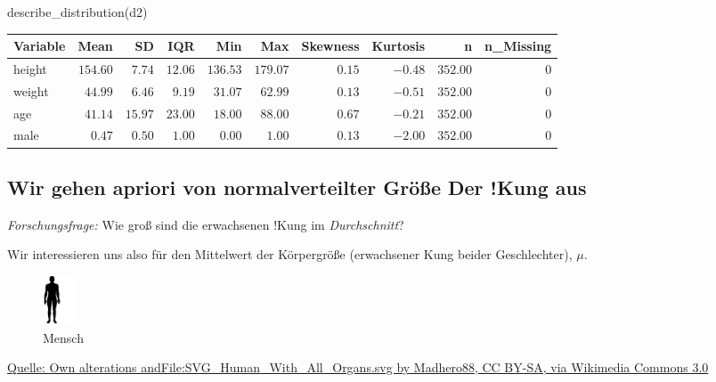 \documentclass[
  a4paper,
  DIV=11]{scrreprt}
\newenvironment{Shaded}{\begin{snugshade}}{\end{snugshade}}
\newcommand{\FunctionTok}[1]{\textcolor[rgb]{0.28,0.35,0.67}{#1}}
\newcommand{\NormalTok}[1]{\textcolor[rgb]{0.00,0.23,0.31}{#1}}
\theoremstyle{definition}
\theoremstyle{remark}
\begin{document}
\begin{Shaded}
\begin{Highlighting}[]
\FunctionTok{describe\_distribution}\NormalTok{(d2)}
\end{Highlighting}
\end{Shaded}

\begin{longtable}{lrrrrrrrrr}
\toprule
Variable & Mean & SD & IQR & Min & Max & Skewness & Kurtosis & n & n\_Missing \\ 
\midrule
height & $154.60$ & $7.74$ & $12.06$ & $136.53$ & $179.07$ & $0.15$ & $-0.48$ & $352.00$ & $0$ \\ 
weight & $44.99$ & $6.46$ & $9.19$ & $31.07$ & $62.99$ & $0.13$ & $-0.51$ & $352.00$ & $0$ \\ 
age & $41.14$ & $15.97$ & $23.00$ & $18.00$ & $88.00$ & $0.67$ & $-0.21$ & $352.00$ & $0$ \\ 
male & $0.47$ & $0.50$ & $1.00$ & $0.00$ & $1.00$ & $0.13$ & $-2.00$ & $352.00$ & $0$ \\ 
\bottomrule
\end{longtable}

\hypertarget{wir-gehen-apriori-von-normalverteilter-gruxf6uxdfe-der-kung-aus}{%
\subsection{Wir gehen apriori von normalverteilter Größe Der !Kung
aus}\label{wir-gehen-apriori-von-normalverteilter-gruxf6uxdfe-der-kung-aus}}

\emph{Forschungsfrage:} Wie groß sind die erwachsenen !Kung im
\emph{Durchschnitt}?

Wir interessieren uns also für den Mittelwert der Körpergröße
(erwachsener Kung beider Geschlechter), \(\mu\).

\begin{figure}

{\centering \includegraphics[width=0.05\textwidth,height=\textheight]{./img/human.png}

}

\caption{Mensch}

\end{figure}

\href{https://creativecommons.org/licenses/by-sa/3.0}{Quelle: Own
alterations andFile:SVG\_Human\_With\_All\_Organs.svg by Madhero88, CC
BY-SA, via Wikimedia Commons 3.0}
\end{document}
